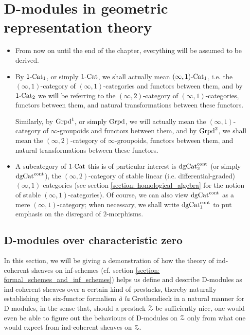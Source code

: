 \chapter{D-modules in geometric representation theory}
    \begin{abstract}
        
    \end{abstract}
    
    \minitoc
    
    \begin{convention} \label{conv: D_modules_everything_is_derived}
        \noindent
        \begin{itemize}
            \item From now on until the end of the chapter, everything will be assumed to be derived. 
            \item By $1\text{-}\mathrm{Cat}_1$, or simply $1\text{-}\mathrm{Cat}$, we shall actually mean $(\infty, 1)\text{-}\mathrm{Cat}_1$, i.e. the $(\infty, 1)$-category of $(\infty, 1)$-categories and functors between them, and by $1\text{-}\mathrm{Cat}_2$ we will be referring to the $(\infty, 2)$-category of $(\infty, 1)$-categories, functors between them, and natural transformations between these functors. 
            
            Similarly, by $\mathrm{Grpd}^1$, or simply $\mathrm{Grpd}$, we will actually mean the $(\infty, 1)$-category of $\infty$-groupoids and functors between them, and by $\mathrm{Grpd}^2$, we shall mean the $(\infty, 2)$-category of $\infty$-groupoids, functors between them, and natural transformations between these functors.
            \item A subcategory of $1\text{-}\mathrm{Cat}$ this is of particular interest is $\mathrm{dg}\mathrm{Cat}^{\mathrm{cont}}_2$ (or simply $\mathrm{dg}\mathrm{Cat}^{\mathrm{cont}}$), the $(\infty, 2)$-category of stable linear (i.e. differential-graded) $(\infty, 1)$-categories (see section \ref{section: homological_algebra} for the notion of stable $(\infty, 1)$-categories). Of course, we can also view $\mathrm{dg}\mathrm{Cat}^{\mathrm{cont}}$ as a mere $(\infty, 1)$-category; when necessary, we shall write $\mathrm{dg}\mathrm{Cat}^{\mathrm{cont}}_1$ to put emphasis on the disregard of $2$-morphisms.
        \end{itemize} 
    \end{convention}
    
    \section{D-modules over characteristic zero}
        In this section, we will be giving a demonstration of how the theory of ind-coherent sheaves on inf-schemes (cf. section \ref{section: formal_schemes_and_inf_schemes}) helps us define and describe D-modules as ind-coherent sheaves over a certain kind of prestacks, thereby naturally establishing the six-functor formalism \textit{\`a la} Grothendieck in a natural manner for D-modules, in the sense that, should a prestack $\mathcal{Z}$ be sufficiently nice, one would even be able to figure out the behaviours of D-modules on $\mathcal{Z}$ only from what one would expect from ind-coherent sheaves on $\mathcal{Z}$. 
        
